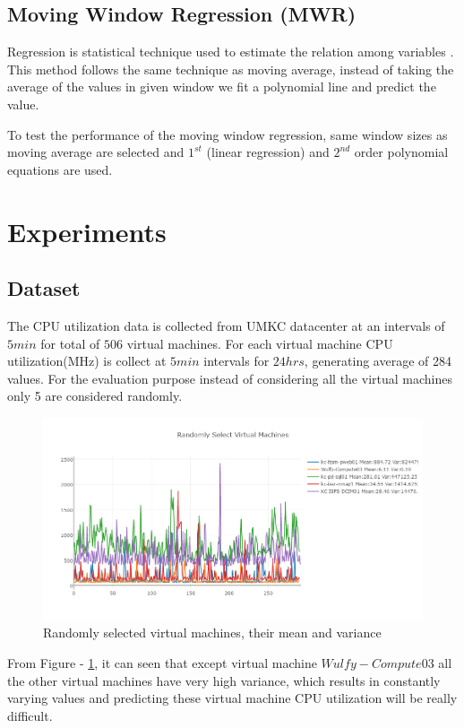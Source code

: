 \documentclass[conference,onecolumn]{IEEEtran}
\begin{document}
\subsection{Moving Window Regression (MWR)}
\label{subsec:MWR}
Regression is statistical technique used to estimate the relation among variables \cite{MWR}. This method follows the same technique as moving average, instead of taking the average of the values in given window we fit a polynomial line and predict the value.

To test the performance of the moving window regression, same window sizes as moving average are selected and $1^{st}$ (linear regression) and $2^{nd}$ order polynomial equations are used. 

\section{Experiments}
\label{sec:Experiments}

\subsection{Dataset}
\label{subsec:data}
The CPU utilization data is collected from UMKC datacenter at an intervals of $5min$ for total of $506$ virtual machines. For each virtual machine CPU utilization(MHz) is collect at $5 min$ intervals for $24 hrs$, generating average of 284 values. For the evaluation purpose instead of considering all the virtual machines only 5 are considered randomly.

\begin{figure}[ht]
\includegraphics[scale=0.4]{sel_vms}
\centering
\caption{Randomly selected virtual machines, their mean and variance}
\label{fig:sel_vm}
\end{figure}

From Figure - \ref{fig:sel_vm}, it can seen that except virtual machine $Wulfy-Compute03$ all the other virtual machines have very high variance, which results in constantly varying values and predicting these virtual machine CPU utilization will be really difficult.
\end{document}
